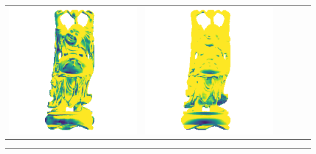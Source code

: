 \begin{tabularx}{\linewidth}{@{}Y@{}Y@{}Y@{}Y@{}Y@{}Y@{}}
\includegraphics[width=\linewidth]{semisynthetic/20160617_20_marrnet_err.png} &
\includegraphics[width=\linewidth]{semisynthetic/20160617_20_ef_err.png} \\
\end{tabularx}
\begin{center}\rule{0.5\linewidth}{\linethickness}\end{center}

